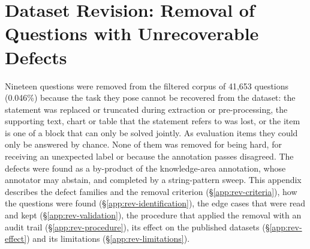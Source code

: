 %
%

\section{Dataset Revision: Removal of Questions with Unrecoverable Defects}
\label{app:rev}

Nineteen questions were removed from the filtered corpus of 41,653 questions
(0.046\%) because the task they pose cannot be recovered from the dataset: the
statement was replaced or truncated during extraction or pre-processing, the
supporting text, chart or table that the statement refers to was lost, or the
item is one of a block that can only be solved jointly. As evaluation items
they could only be answered by chance. None of them was removed for being
hard, for receiving an unexpected label or because the annotation passes
disagreed. The defects were found as a by-product of the knowledge-area
annotation, whose annotator may abstain, and completed by a string-pattern
sweep. This appendix describes the defect families and the removal criterion
(\S\ref{app:rev-criteria}), how the questions were found
(\S\ref{app:rev-identification}), the edge cases that were read and kept
(\S\ref{app:rev-validation}), the procedure that applied the removal with an
audit trail (\S\ref{app:rev-procedure}), its effect on the published datasets
(\S\ref{app:rev-effect}) and its limitations (\S\ref{app:rev-limitations}).

